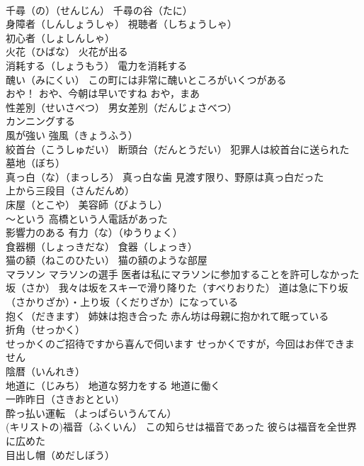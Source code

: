 \documentclass[8pt]{extreport}
\begin{document}
\begin{CJK}{UTF8}{min}
\\	千尋（の）（せんじん） 千尋の谷（たに）
\\	身障者（しんしょうしゃ） 視聴者（しちょうしゃ） 
\\	初心者（しょしんしゃ）
\\	火花（ひばな） 火花が出る
\\	消耗する（しょうもう） 電力を消耗する
\\	醜い（みにくい） この町には非常に醜いところがいくつがある
\\	おや！ おや、今朝は早いですね おや，まあ
\\	性差別（せいさべつ） 男女差別（だんじょさべつ）
\\	カンニングする
\\	風が強い 強風（きょうふう）
\\	絞首台（こうしゅだい） 断頭台（だんとうだい） 犯罪人は絞首台に送られた
\\	墓地（ぼち）
\\	真っ白（な）（まっしろ） 真っ白な歯 見渡す限り、野原は真っ白だった
\\	上から三段目（さんだんめ）
\\	床屋（とこや） 美容師（びようし）
\\	～という 高橋という人電話があった
\\	影響力のある 有力（な）（ゆうりょく）
\\	食器棚（しょっきだな） 食器（しょっき）
\\	猫の額（ねこのひたい） 猫の額のような部屋
\\	マラソン マラソンの選手 医者は私にマラソンに参加することを許可しなかった
\\	坂（さか） 我々は坂をスキーで滑り降りた（すべりおりた） 道は急に下り坂（さかりざか）・上り坂（くだりざか）になっている
\\	抱く（だきます） 姉妹は抱き合った 赤ん坊は母親に抱かれて眠っている
\\	折角（せっかく） 
\\	せっかくのご招待ですから喜んで伺います せっかくですが，今回はお伴できません
\\	陰暦（いんれき）
\\	地道に（じみち） 地道な努力をする 地道に働く
\\	一昨昨日（さきおととい）
\\	酔っ払い運転 （よっぱらいうんてん）
\\	(キリストの)福音（ふくいん） この知らせは福音であった 彼らは福音を全世界に広めた
\\	目出し帽（めだしぼう） 

\end{CJK}
\end{document}
